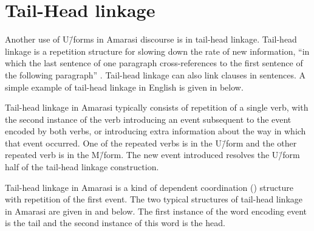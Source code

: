 \section{Tail-Head linkage}\label{sec:TaiHeaLin}
Another use of U\=/forms in Amarasi discourse is in tail-head linkage.
Tail-head linkage is a repetition structure for slowing down the rate of new information,
``in which the last sentence of one paragraph cross-references to the first sentence 
of the following paragraph'' \citep[9]{lo83}.
Tail-head linkage can also link clauses in sentences.
A simple example of tail-head linkage in English is given in  below.

\begin{exe}
	\label{ex:TaiHeEng}
\end{exe}

Tail-head linkage in Amarasi typically consists of repetition of a single
verb, with the second instance of the verb introducing an event subsequent
to the event encoded by both verbs,
or introducing extra information about the way in which that event occurred.
One of the repeated verbs is in the U\=/form and the other
repeated verb is in the M\=/form.
The new event introduced resolves the U\=/form half of the tail-head linkage construction.

Tail-head linkage in Amarasi is a kind of dependent
coordination () structure with repetition of the first event.
The two typical structures of tail-head linkage in Amarasi
are given in  and  below.
The first instance of the word encoding event is the tail
and the second instance of this word is the head.

\begin{exe}
	\label{ex:THL}
	\label{ex:THL2}
\end{exe}

